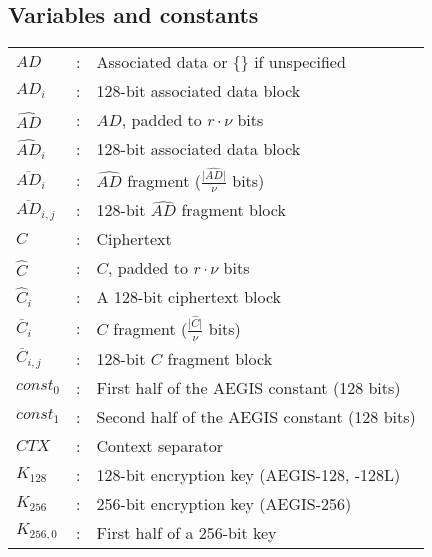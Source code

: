 \documentclass[envcountsame,runningheads,notitlepage]{llncs}
\begin{document}
\subsection{Variables and constants}

\begin{tabular}{l c p{}}
  $AD$                  & : & Associated data or $\{\}$ if unspecified                        \\
  $AD_i$                & : & 128-bit associated data block                                   \\
  $\hat{AD}$            & : & $AD$, padded to $r \cdot \nu$ bits                              \\
  $\hat{AD}_i$          & : & 128-bit associated data block                                   \\
  $\overline{AD}_i$     & : & $\hat{AD}$ fragment ($\frac{\lvert \hat{AD} \rvert}{\nu}$ bits) \\
  $\overline{AD}_{i,j}$ & : & 128-bit $\hat{AD}$ fragment block                               \\
  $C$                   & : & Ciphertext                                                      \\
  $\hat{C}$             & : & $C$, padded to $r \cdot \nu$ bits                               \\
  $\hat{C}_i$           & : & A 128-bit ciphertext block                                      \\
  $\overline{C}_i$      & : & $C$ fragment ($\frac{\lvert \hat{C} \rvert}{\nu}$ bits)         \\
  $\overline{C}_{i,j}$  & : & 128-bit $C$ fragment block                                      \\
  $const_0$             & : & First half of the AEGIS constant (128 bits)                     \\
  $const_1$             & : & Second half of the AEGIS constant (128 bits)                    \\
  $CTX$                 & : & Context separator                                               \\
  $K_{128}$             & : & 128-bit encryption key (AEGIS-128, -128L)                       \\
  $K_{256}$             & : & 256-bit encryption key (AEGIS-256)                              \\
  $K_{256,0}$           & : & First half of a 256-bit key                                     \\

\end{tabular}
\end{document}
